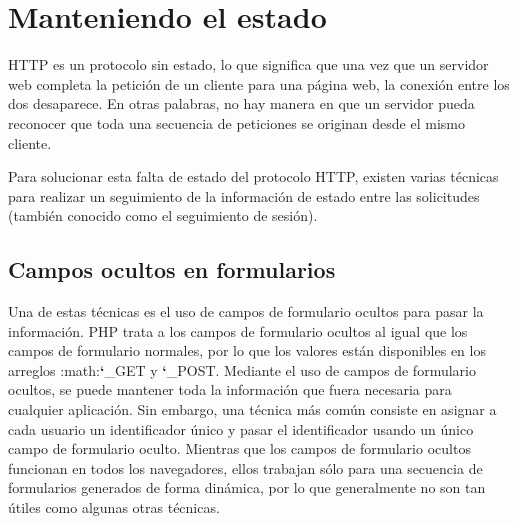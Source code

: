 \documentclass[a5paper,10pt,spanish]{sphinxmanual}
\begin{document}
\section{Manteniendo el estado}
\label{Tutorial3_Sesiones.md:manteniendo-el-estado}\label{Tutorial3_Sesiones.md::doc}
HTTP es un protocolo sin estado, lo que significa que una vez que un
servidor web completa la petición de un cliente para una página web, la
conexión entre los dos desaparece. En otras palabras, no hay manera en
que un servidor pueda reconocer que toda una secuencia de peticiones se
originan desde el mismo cliente.

Para solucionar esta falta de estado del protocolo HTTP, existen varias
técnicas para realizar un seguimiento de la información de estado entre
las solicitudes (también conocido como el seguimiento de sesión).


\subsection{Campos ocultos en formularios}
\label{Tutorial3_Sesiones.md:campos-ocultos-en-formularios}
Una de estas técnicas es el uso de campos de formulario ocultos para
pasar la información. PHP trata a los campos de formulario ocultos al
igual que los campos de formulario normales, por lo que los valores
están disponibles en los arreglos :math:{\color{red}\bfseries{}{}`}\_GET y {\color{red}\bfseries{}{}`}\_POST. Mediante el
uso de campos de formulario ocultos, se puede mantener toda la
información que fuera necesaria para cualquier aplicación. Sin embargo,
una técnica más común consiste en asignar a cada usuario un
identificador único y pasar el identificador usando un único campo de
formulario oculto. Mientras que los campos de formulario ocultos
funcionan en todos los navegadores, ellos trabajan sólo para una
secuencia de formularios generados de forma dinámica, por lo que
generalmente no son tan útiles como algunas otras técnicas.
\end{document}
